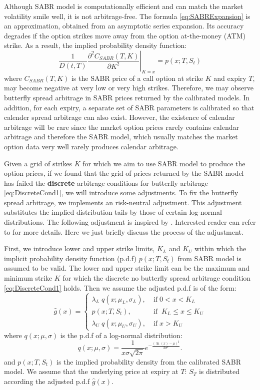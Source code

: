 \documentclass[letterpaper,12pt,titlepage,oneside,final]{book}
\numberwithin{equation}{section}
\theoremstyle{definition}
\begin{document}
Although SABR model is computationally efficient and can match the market volatility smile well, it is not arbitrage-free. The formula \eqref{eq:SABRExpansion} is an approximation, obtained from  an asymptotic series expansion. Its accuracy degrades if the option strikes move away from the option at-the-money (ATM) strike. As a result, the implied probability density function:
\begin{equation}
	\frac{1}{D(t,T)} \left. \frac{\partial^2 C_{SABR}(T,K)}{\partial K^2} \right\vert_{K=x}=	p(x;T,S_t) 
	\label{eq:impliedDensity}
\end{equation}
where $C_{SABR}(T,K)$ is the SABR price of a call option at strike $K$ and expiry $T$, may become negative at very low or very high strikes. Therefore, we may observe butterfly spread arbitrage in SABR prices returned by the calibrated models. In addition, for each expiry, a separate set of SABR parameters is calibrated so that calender spread arbitrage can also exist. However, the existence of calendar arbitrage will be rare since the market option prices rarely contains calendar arbitrage and therefore the SABR model, which usually matches the  market option data very well rarely produces calendar arbitrage.


Given a grid of strikes $K$ for which we aim to use SABR model to produce the option prices, if we found that the grid of prices returned by the SABR model has failed the  \textbf{discrete} arbitrage conditions for butterfly arbitrage \eqref{eq:DiscreteCond1}, we will introduce some adjustments. To fix the butterfly spread  arbitrage, we implements an risk-neutral adjustment. This adjustment substitutes the implied distribution tails by those of certain log-normal distributions. The following  adjustment is inspired by \cite{brunner2003arbitrage}. Interested reader can refer to \cite{brunner2003arbitrage} for more details. Here we just briefly discuss the process of the adjustment.

First, we introduce lower and upper strike limits, $K_{L}$ and $K_{U}$ within which the implicit probability density function (p.d.f) $p(x;T,S_t)$ from SABR model is assumed to be valid. The lower and upper strike limit can be the maximum and minimum strike $K$ for which the  discrete no butterfly spread arbitrage condition \eqref{eq:DiscreteCond1} holds. Then we assume the adjusted p.d.f is of the form:
\[
\hat{g}(x)=\left\{ \begin{array}{ll }
\lambda_{L} \;  q(x;\mu_{L},\sigma_{L}), \;&  \text{if} \; 0<x< K_{L}\\
p(x;T,S_t) , \;&  \text{if} \; \;  K_{L} \leq x \leq K_{U}\\
\lambda_{U} \;  q(x;\mu_{U},\sigma_{U}), \;& \text{if} \; x> K_{U}
\end{array} \right.
\]
where  $q(x;\mu,\sigma)$ is the p.d.f of a  log-normal distribution:
\[
	q(x;\mu,\sigma)=\frac{1}{x\sigma \sqrt{2 \pi}}
	e^{-\frac{(\ln(x)-\mu)^2}{2 \sigma^2}}.
\]
and $p(x;T,S_t)$ is the implied probability density from the calibrated SABR model. We assume that the underlying price at expiry at $T$: $S_T$ is distributed according the adjusted p.d.f $\hat{g}(x)$.
\end{document}

